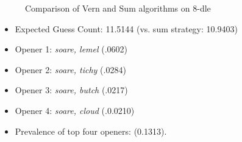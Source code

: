 \documentclass[11pt, oneside]{article} 	%
\begin{document}
\begin{figure}[!htb]
 \centering
 \qquad
 \caption{Comparison of Vern and Sum algorithms on 8-dle}%
\end{figure}


\begin{itemize}
\item Expected Guess Count: 11.5144 (vs. sum strategy: 10.9403)
\item Opener 1: \emph{soare, lemel} (.0602)
\item Opener 2: \emph{soare, tichy} (.0284)
\item Opener 3: \emph{soare, butch} (.0217)
\item Opener 4: \emph{soare, cloud} (.0.0210)
\item Prevalence of top four openers: (0.1313). 
\end{itemize}
\end{document}
